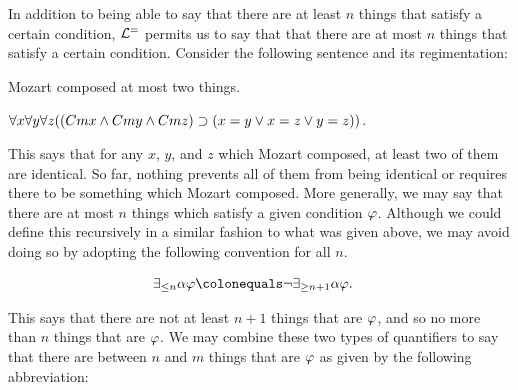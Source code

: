 In addition to being able to say that there are at least $n$ things that satisfy a certain condition, $\mathcal{L}^{=}$ permits us to say that that there are at most $n$ things that satisfy a certain condition. 
Consider the following sentence and its regimentation:

\begin{earg}
  \item[\ex{Q3}] Mozart composed at most two things.
  \item[\ex{Q4}] $\forall x\forall y\forall z((Cmx \wedge Cmy \wedge Cmz) \supset (x = y \vee x = z \vee y = z))$.
\end{earg}

This says that for any $x$, $y$, and $z$ which Mozart composed, at least two of them are identical. 
So far, nothing prevents all of them from being identical or requires there to be something which Mozart composed. 
%
%
More generally, we may say that there are at most $n$ things which satisfy a given condition $\varphi$.
Although we could define this recursively in a similar fashion to what was given above, we may avoid doing so by adopting the following convention for all $n$.

\vspace{-.2in}
\begin{align*}
  \qt{\exists_{\leq n}}{\alpha}\metaA &\colonequals \neg\qt{\exists_{\geq n+1}}{\alpha}\metaA.
\end{align*}
\vspace{-.2in}

This says that there are not at least $n+1$ things that are $\varphi$, and so no more than $n$ things that are $\varphi$. 
We may combine these two types of quantifiers to say that there are between $n$ and $m$ things that are $\varphi$ as given by the following abbreviation: 

